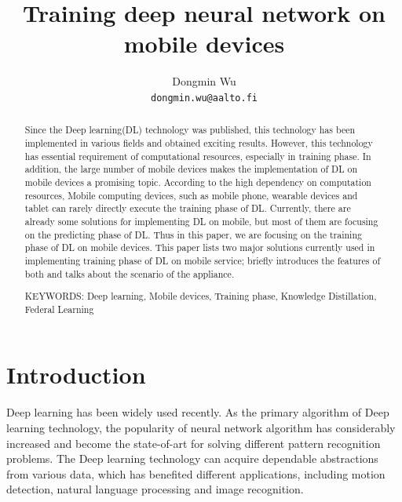 \documentclass[article]{aaltoseries}
\begin{document}
 

\title{Training deep neural network on mobile devices}

\author{Dongmin Wu
\\\textnormal{\texttt{dongmin.wu@aalto.fi}}} %


\maketitle


\begin{abstract}


  Since the Deep learning(DL) technology was published, this technology has been
  implemented in various fields and obtained exciting results. 
  However, this technology has essential requirement of computational resources, especially
  in training phase. In addition, the large number of mobile devices makes the implementation
  of DL on mobile devices a promising topic. 
 According to the high dependency on computation resources,
 Mobile computing devices, such as mobile phone,
  wearable devices and tablet can rarely directly execute the training phase of DL. 
 Currently, there are already some solutions for implementing DL on mobile\cite{Ota:2017},
 but most of them are focusing on the predicting phase of DL. 
 Thus in this paper, we are focusing on the training phase of DL on mobile devices.
 This paper lists two major solutions currently used in implementing training phase of DL on mobile service;
 briefly introduces the features of both and talks about the scenario of the appliance. 


\vspace{3mm}
\noindent KEYWORDS: Deep learning, Mobile devices, Training phase, Knowledge Distillation, Federal Learning

\end{abstract}




\section{Introduction}


Deep learning has been widely used recently. As the primary algorithm of Deep learning technology,
 the popularity of neural network algorithm 
 has considerably increased and become the state-of-art for solving different pattern recognition
problems.
The Deep learning technology can acquire 
  dependable abstractions from various data, which has benefited different applications, 
  including motion detection, natural language processing and image recognition. 
\end{document}
